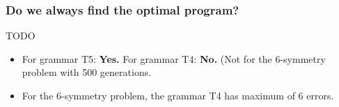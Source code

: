 \begin{frame}
\frametitle{
Do we always find the optimal program?
}
TODO \begin{itemize}
\item For grammar T5: {\bf Yes.}
       For grammar T4: {\bf No.}
       (Not for the 6-symmetry problem with 500 generations.
\item For the 6-symmetry problem, the grammar T4 has maximum of 6 errors.
\end{itemize}
\end{frame}